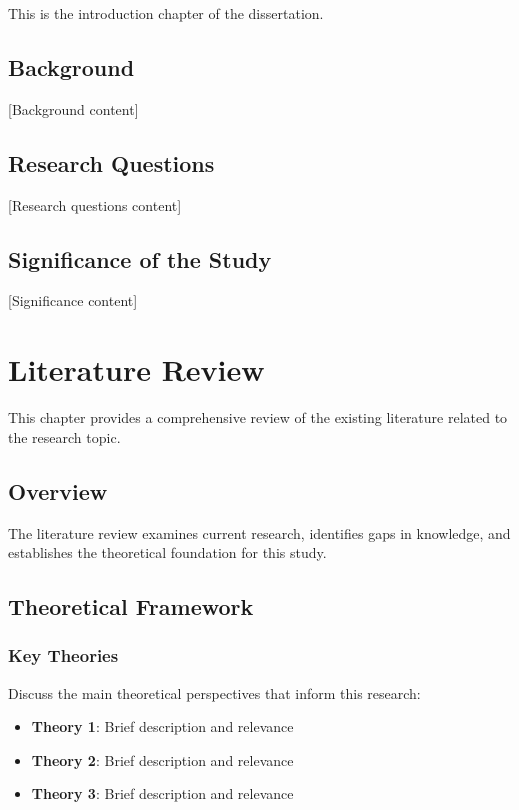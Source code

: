 \documentclass[
  12pt,
  letterpaper,
  12pt,
  letterpaper,
  oneside]{report}
\providecommand{\tightlist}{%
  \setlength{\itemsep}{0pt}\setlength{\parskip}{0pt}}
\begin{document}
This is the introduction chapter of the dissertation.

\section{Background}\label{background}

{[}Background content{]}

\section{Research Questions}\label{research-questions}

{[}Research questions content{]}

\section{Significance of the Study}\label{significance-of-the-study}

{[}Significance content{]}


\chapter{Literature Review}\label{literature-review}

This chapter provides a comprehensive review of the existing literature
related to the research topic.

\section{Overview}\label{overview}

The literature review examines current research, identifies gaps in
knowledge, and establishes the theoretical foundation for this study.

\section{Theoretical Framework}\label{theoretical-framework}

\subsection{Key Theories}\label{key-theories}

Discuss the main theoretical perspectives that inform this research:

\begin{itemize}
\tightlist
\item
  \textbf{Theory 1}: Brief description and relevance
\item
  \textbf{Theory 2}: Brief description and relevance
\item
  \textbf{Theory 3}: Brief description and relevance
\end{itemize}
\end{document}
